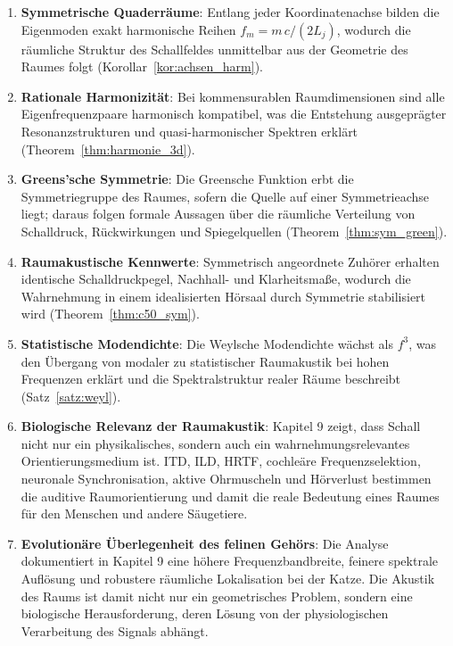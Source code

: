 ﻿\documentclass[12pt, a4paper]{article}
\theoremstyle{definition}
\theoremstyle{remark}
\begin{document}
\begin{enumerate}
\item \textbf{Symmetrische Quaderräume}: Entlang jeder Koordinatenachse bilden
  die Eigenmoden exakt harmonische Reihen $f_m = m\,c/(2L_j)$, wodurch die
  räumliche Struktur des Schallfeldes unmittelbar aus der Geometrie des Raumes
  folgt (Korollar~\ref{kor:achsen_harm}).

\item \textbf{Rationale Harmonizität}: Bei kommensurablen Raumdimensionen
  sind alle Eigenfrequenzpaare harmonisch kompatibel, was die Entstehung
  ausgeprägter Resonanzstrukturen und quasi-harmonischer Spektren erklärt
  (Theorem~\ref{thm:harmonie_3d}).

\item \textbf{Greens'sche Symmetrie}: Die Greensche Funktion erbt die
  Symmetriegruppe des Raumes, sofern die Quelle auf einer Symmetrieachse liegt;
  daraus folgen formale Aussagen über die räumliche Verteilung von Schalldruck,
  Rückwirkungen und Spiegelquellen (Theorem~\ref{thm:sym_green}).

\item \textbf{Raumakustische Kennwerte}: Symmetrisch angeordnete Zuhörer
  erhalten identische Schalldruckpegel, Nachhall- und Klarheitsmaße, wodurch
  die Wahrnehmung in einem idealisierten Hörsaal durch Symmetrie stabilisiert
  wird (Theorem~\ref{thm:c50_sym}).

\item \textbf{Statistische Modendichte}: Die Weylsche Modendichte wächst als
  $f^3$, was den Übergang von modaler zu statistischer Raumakustik bei hohen
  Frequenzen erklärt und die Spektralstruktur realer Räume beschreibt
  (Satz~\ref{satz:weyl}).

\item \textbf{Biologische Relevanz der Raumakustik}: Kapitel 9 zeigt, dass
  Schall nicht nur ein physikalisches, sondern auch ein wahrnehmungsrelevantes
  Orientierungsmedium ist. ITD, ILD, HRTF, cochleäre Frequenzselektion,
  neuronale Synchronisation, aktive Ohrmuscheln und Hörverlust bestimmen die
  auditive Raumorientierung und damit die reale Bedeutung eines Raumes für den
  Menschen und andere Säugetiere.

\item \textbf{Evolutionäre Überlegenheit des felinen Gehörs}: Die Analyse
  dokumentiert in Kapitel 9 eine höhere Frequenzbandbreite, feinere spektrale
  Auflösung und robustere räumliche Lokalisation bei der Katze. Die Akustik des
  Raums ist damit nicht nur ein geometrisches Problem, sondern eine biologische
  Herausforderung, deren Lösung von der physiologischen Verarbeitung des Signals
  abhängt.
\end{enumerate}
\end{document}
